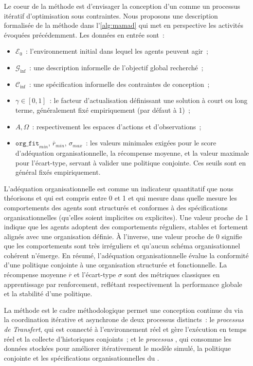 Le coeur de la méthode  est d'envisager la conception d'un  comme un processus itératif d'optimisation sous contraintes. Nous proposons une description formalisée de la méthode  dans l'\autoref{alg:mamad} qui met en perspective les activités évoquées précédemment. Les données en entrée sont~:
\begin{itemize}
    \item $\mathcal{E}_0$~: l'environnement initial dans lequel les agents peuvent agir~;
    \item $\mathcal{G}_{\text{inf}}$~: une description informelle de l'objectif global recherché~;
    \item $\mathcal{C}_{\text{inf}}$~: une spécification informelle des contraintes de conception~;
    \item $\gamma \in [0,1]$~: le facteur d'actualisation définissant une solution à court ou long terme, généralement fixé empiriquement (par défaut à 1)~;
    \item $A, \Omega$~: respectivement les espaces d'actions et d'observations~;
    \item $\texttt{org\_fit}_{min}$, $\overline{r}_{min}$, $\sigma_{max}$~: les valeurs minimales exigées pour le score d'adéquation organisationnelle, la récompense moyenne, et la valeur maximale pour l'écart-type, servant à valider une politique conjointe. Ces seuils sont en général fixés empiriquement.
\end{itemize}

L'adéquation organisationnelle est comme un indicateur quantitatif que nous théorisons et qui est compris entre 0 et 1 et qui mesure dans quelle mesure les comportements des agents sont structurés et conformes à des spécifications organisationnelles (qu'elles soient implicites ou explicites). Une valeur proche de 1 indique que les agents adoptent des comportements réguliers, stables et fortement alignés avec une organisation définie. À l'inverse, une valeur proche de 0 signifie que les comportements sont très irréguliers et qu'aucun schéma organisationnel cohérent n'émerge. En résumé, l'adéquation organisationnelle évalue la conformité d'une politique conjointe à une organisation structurée et fonctionnelle.
La récompense moyenne $\overline{r}$ et l'écart-type $\sigma$ sont des métriques classiques en apprentissage par renforcement, reflétant respectivement la performance globale et la stabilité d'une politique.


La méthode  est le cadre méthodologique permet une conception continue du  via la coordination itérative et asynchrone de deux processus distincts~: le \textit{processus de Transfert}, qui est connecté à l'environnement réel et gère l'exécution en temps réel et la collecte d'historiques conjoints~; et le \textit{processus }, qui consomme les données stockées pour améliorer itérativement le modèle simulé, la politique conjointe et les spécifications organisationnelles du .


